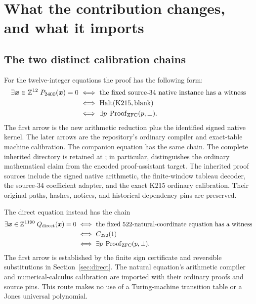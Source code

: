 \section{What the contribution changes, and what it imports}\label{sec:dependencies}

\subsection{The two distinct calibration chains}
For the twelve-integer equations the proof has the following form:
\begin{align*}
 \exists\boldsymbol x\in\Z^{12}\;\primary(\boldsymbol x)=0
 &\ \Longleftrightarrow\ 
 \text{the fixed source-34 native instance has a witness}\\
 &\ \Longleftrightarrow\ \operatorname{Halt}(\mathrm{K215},\text{blank})\\
 &\ \Longleftrightarrow\ \exists p\;\operatorname{Proof}_{\ZFC}(p,\bot).
\end{align*}
The first arrow is the new arithmetic reduction plus the identified
signed native kernel. The later arrows are the repository's ordinary
compiler and exact-table machine calibration. The companion equation has
the same chain. The complete inherited directory is retained at
; in particular,
 distinguishes the ordinary
mathematical claim from the encoded proof-assistant target.
The inherited proof sources include the signed native arithmetic,
the finite-window tableau decoder, the source-34 coefficient adapter,
and the exact K215 ordinary calibration. Their original paths,
hashes, notices, and historical dependency pins are preserved.

The direct equation instead has the chain
\begin{align*}
 \exists\boldsymbol x\in\Z^{1190}\;
 Q_{\mathrm{direct}}(\boldsymbol x)=0
 &\ \Longleftrightarrow\ 
 \text{the fixed 522-natural-coordinate equation has a witness}\\
 &\ \Longleftrightarrow\ C_{222}(1)\\
 &\ \Longleftrightarrow\ \exists p\;\operatorname{Proof}_{\ZFC}(p,\bot).
\end{align*}
The first arrow is established by the finite sign certificate and
reversible substitutions in Section~\ref{sec:direct}. The natural
equation's arithmetic compiler and numerical-calculus calibration are
imported with their ordinary proofs and source pins. This route makes no
use of a Turing-machine transition table or a Jones universal polynomial.

